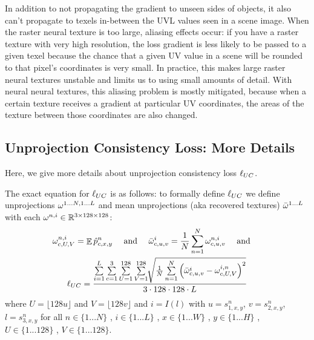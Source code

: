 	In addition to not propagating the gradient to unseen sides of objects, it also can't propagate to texels in-between the UVL values seen in a scene image.
	When the raster neural texture is too large, aliasing effects occur: if you have a raster texture with very high resolution, the loss gradient is less likely to be passed to a given texel because the chance that a given UV value in a scene will be rounded to that pixel's coordinates is very small.
	In practice, this makes large raster neural textures unstable and limits us to using small amounts of detail.
	With neural neural textures, this aliasing problem is mostly mitigated, because when a certain texture receives a gradient at particular UV coordinates, the areas of the texture between those coordinates are also changed.

\subsection{Unprojection Consistency Loss: More Details}

	Here, we give more details about unprojection consistency loss $\ell_{UC}$.

	The exact equation for $\ell_{UC}$ is as follows:
	to formally define $\ell_{UC}$ we define unprojections $\omega^{1...N,1...L}$ and mean unprojections (aka recovered textures) $\bar{\omega}^{1...L}$ 
	with each $\omega^{n,i}\in\mathbb{R}^{3\times128\times128}$:
	\begin{multline}
		\omega_{c,U,V}^{n,i}=\mathop{\mathbb{E}}\hat{p}_{c,x,y}^n 
		\ \ \ \text{ and }\ \ \  \bar{\omega}^i_{c,u,v}   =   
			\frac{1}{N} \sum\limits_{n=1}^N\omega^{n,i}_{c,u,v} 
		\ \ \ \text{ and }\ \ \  \\
		\ell_{UC}=\frac{\sum\limits_{i=1}^L\sum\limits_{c=1}^3\sum\limits_{U=1}^{128}\sum\limits_{V=1}^{128}
		\sqrt[]{\frac{1}{N}\sum\limits_{n=1}^N\left(\bar{\omega}^i_{c,u,v}-\omega^{i,n}_{c,U,V}\right)^2}}
		{3\cdot128\cdot128\cdot L}
	\end{multline}
	where $U=\lfloor128u\rfloor$ and $V=\lfloor128v\rfloor$ and $i=I(l)$ with
	$u=s^n_{1,x,y}$, $v=s^n_{2,x,y}$, $l=s^n_{3,x,y}$
	for all 
	$n \in \{1...N\}$ , 
	$i \in \{1...L\}$ , 
	$x \in \{1...W\}$ , 
	$y \in \{1...H\}$ , 
	$U \in \{1...128\}$ , 
	$V \in \{1...128\}$.

